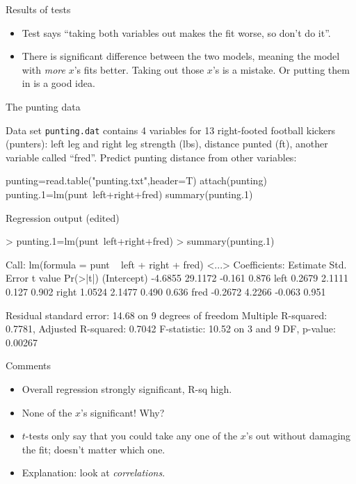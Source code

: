 \begin{frame}[fragile]{Results of tests}


\begin{itemize}
\item Test says ``taking both variables out makes the fit worse, so don't do it''.
\item There is significant difference between the two models, meaning
  the model with \emph{more} $x$'s fits better. Taking out those $x$'s
  is a mistake. Or putting them in is a good idea.
\end{itemize}
  
\end{frame}

\begin{frame}[fragile]{The punting data}

  Data set \verb-punting.dat- contains 4 variables for 13 right-footed
  football kickers (punters): left leg and right leg strength (lbs),
  distance punted (ft), another variable called ``fred''. Predict
  punting distance from other variables:

\begin{semiverbatim}
punting=read.table("punting.txt",header=T)
attach(punting)
punting.1=lm(punt~left+right+fred)
summary(punting.1)
\end{semiverbatim}

  
\end{frame}

\begin{frame}[fragile]{Regression output (edited)}
  
{\scriptsize
\begin{semiverbatim}
> punting.1=lm(punt~left+right+fred)
> summary(punting.1)

Call:
lm(formula = punt ~ left + right + fred)
<...>
Coefficients:
            Estimate Std. Error t value Pr(>|t|)
(Intercept)  -4.6855    29.1172  -0.161    0.876
left          0.2679     2.1111   0.127    0.902
right         1.0524     2.1477   0.490    0.636
fred         -0.2672     4.2266  -0.063    0.951

Residual standard error: 14.68 on 9 degrees of freedom
Multiple R-squared: 0.7781,	Adjusted R-squared: 0.7042 
F-statistic: 10.52 on 3 and 9 DF,  p-value: 0.00267 
\end{semiverbatim}
}

\end{frame}


\begin{frame}{Comments}

  \begin{itemize}
  \item Overall regression strongly significant, R-sq high.
  \item None of the $x$'s significant! Why?
  \item $t$-tests only say that you could take any one of the $x$'s out without damaging the fit; doesn't matter which one.
  \item Explanation: look at {\em correlations}. 
  \end{itemize}
\end{frame}

